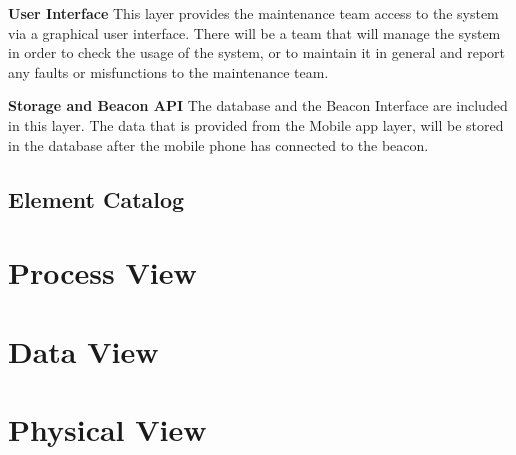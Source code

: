\textbf{User Interface} This layer provides the maintenance team access to the system via a graphical user interface. There will be a team that will manage the system in order to check the usage of the system, or to maintain it in general and report any faults or misfunctions to the maintenance team.

\textbf{Storage and Beacon API} The database and the Beacon Interface are included in this layer. The data that is provided from the Mobile app layer, will be stored in the database after the mobile phone has connected to the beacon.


\subsection{Element Catalog}


\section{Process View}
\section{Data View}
\section{Physical View}